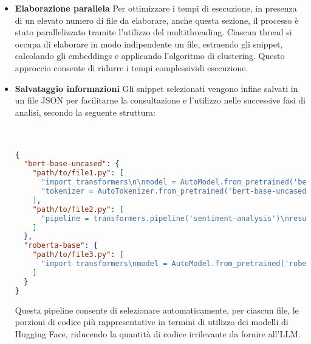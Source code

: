 \documentclass{article}
\begin{document}
\begin{itemize}
\begin{itemize}
        \[
        d(x, c) = \sqrt{\sum_{i=1}^{384} (x_i - c_i)^2}
        \]
        \item \textit{Ricalcolo dei centroidi}: una volta assegnati tutti i punti, per ogni cluster si calcola un nuovo centroide come media aritmetica (punto o vettore medio) degli embeddings appartenenti al cluster. Se $C_{j}$ è l'insieme dei punti del cluster $j$ allora il nuovo cluster $c_{j}$ è definito:
        \[
        c_j = \frac{1}{|C_j|} \sum_{x \in C_j} x
        \]
        \item \textit{Iterazione fino alla convergenza}: I passaggi di assegnazione e ricalcolo dei centroidi vengono ripetuti fino a quando i centroidi non si stabilizzano ovvero non cambiano significativamente tra due iterazioni consecutive, segnando che l'algoritmo sta convergendo
    \end{itemize}
    Una volta raggiunta la convergenza, per ogni cluster si seleziona lo snippet il cui embedding è più vicino al rispettivo centroide. Tale snippet viene considerato il più rappresentativo del gruppo, poiché riassume al meglio le caratteristiche semantiche condivise dagli altri elementi del cluster.
    
    \item \textbf{Elaborazione parallela} Per ottimizzare i tempi di esecuzione, in presenza di un elevato numero di file da elaborare, anche questa sezione, il processo è stato parallelizzato tramite l’utilizzo del multithreading. Ciascun thread si occupa di elaborare in modo indipendente un file, estraendo gli snippet, calcolando gli embeddings e applicando l’algoritmo di clustering. Questo approccio consente di ridurre i tempi complessividi esecuzione.

    \item \textbf{Salvataggio informazioni} Gli snippet selezionati vengono infine salvati in un file JSON per facilitarne la consultazione e l’utilizzo nelle successive fasi di analisi, secondo la seguente struttura:\\\\\\
    \begin{lstlisting}[language=json, caption={Esempio di struttura JSON dei migliori snippet selezionati}, label={lst:json-example}]
{
  "bert-base-uncased": {
    "path/to/file1.py": [
      "import transformers\n\nmodel = AutoModel.from_pretrained('bert-base-uncased')",
      "tokenizer = AutoTokenizer.from_pretrained('bert-base-uncased')\ninputs = tokenizer('Hello world', return_tensors='pt')"
    ],
    "path/to/file2.py": [
      "pipeline = transformers.pipeline('sentiment-analysis')\nresult = pipeline('I love coding!')"
    ]
  },
  "roberta-base": {
    "path/to/file3.py": [
      "import transformers\nmodel = AutoModel.from_pretrained('roberta-base')"
    ]
  }
}
\end{lstlisting}
Questa pipeline consente di selezionare automaticamente, per ciascun file, le porzioni di codice più rappresentative in termini di utilizzo dei modelli di Hugging Face, riducendo la quantità di codice irrilevante da fornire all'LLM.



\end{itemize}
\end{document}
